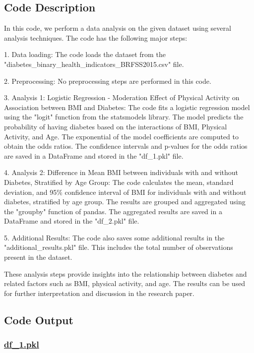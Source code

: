 \documentclass[11pt]{article}
\begin{document}
\subsection{Code Description}

In this code, we perform a data analysis on the given dataset using several analysis techniques. The code has the following major steps:

1. Data loading: The code loads the dataset from the "diabetes\_binary\_health\_indicators\_BRFSS2015.csv" file.

2. Preprocessing: No preprocessing steps are performed in this code.

3. Analysis 1: Logistic Regression - Moderation Effect of Physical Activity on Association between BMI and Diabetes:
   The code fits a logistic regression model using the "logit" function from the statsmodels library. The model predicts the probability of having diabetes based on the interactions of BMI, Physical Activity, and Age. The exponential of the model coefficients are computed to obtain the odds ratios. The confidence intervals and p-values for the odds ratios are saved in a DataFrame and stored in the "df\_1.pkl" file.

4. Analysis 2: Difference in Mean BMI between individuals with and without Diabetes, Stratified by Age Group:
   The code calculates the mean, standard deviation, and 95\% confidence interval of BMI for individuals with and without diabetes, stratified by age group. The results are grouped and aggregated using the "groupby" function of pandas. The aggregated results are saved in a DataFrame and stored in the "df\_2.pkl" file.

5. Additional Results: The code also saves some additional results in the "additional\_results.pkl" file. This includes the total number of observations present in the dataset.

These analysis steps provide insights into the relationship between diabetes and related factors such as BMI, physical activity, and age. The results can be used for further interpretation and discussion in the research paper.

\subsection{Code Output}\hypertarget{file-df-1-pkl}{}

\subsubsection*{\hyperlink{code-Data Analysis-df-1-pkl}{df\_1.pkl}}
\end{document}
